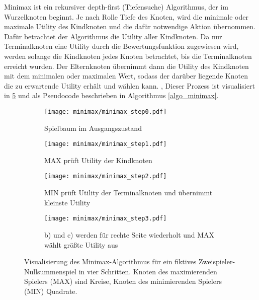 Minimax ist ein rekursiver depth-first (\dt Tiefensuche) Algorithmus, der im Wurzelknoten beginnt. 
Je nach Rolle \bzw Tiefe des Knoten, wird die minimale oder maximale Utility des Kindknoten und die dafür notwendige Aktion übernommen. 
Dafür betrachtet der Algorithmus die Utility aller Kindknoten. 
Da nur Terminalknoten eine Utility durch die Bewertungsfunktion zugewiesen wird, werden solange die Kindknoten jedes Knoten betrachtet, bis die Terminalknoten erreicht wurden. 
Der Elternknoten übernimmt dann die Utility des Kindknoten mit dem minimalen oder maximalen Wert, sodass der darüber liegende Knoten die zu erwartende Utility erhält und wählen kann. \cite[S. 123ff.]{russellArtificialIntelligenceModern2021}, \cite[S. 654ff.]{millingtonArtificialIntelligenceGames2009}
Dieser Prozess ist visualisiert in \cref{fig:minimax_example} und als Pseudocode beschrieben in Algorithmus \ref{algo_minimax}.

\begin{figure}
    \centering
    \begin{subfigure}[b]{0.45\textwidth}
      \centering
      \texttt{[image: minimax/minimax\_step0.pdf]}
      \caption{Spielbaum im Ausgangszustand}
      \label{fig:minimax_step0}
    \end{subfigure}
    \begin{subfigure}[b]{0.45\textwidth}
      \centering
      \texttt{[image: minimax/minimax\_step1.pdf]}
      \caption{MAX prüft Utility der Kindknoten}
      \label{fig:minimax_step1}
    \end{subfigure}
    \begin{subfigure}[b]{0.45\textwidth}
      \centering
      \texttt{[image: minimax/minimax\_step2.pdf]}
      \caption{MIN prüft Utility der Terminalknoten und übernimmt kleinste Utility}
      \label{fig:minimax_step2}
    \end{subfigure}
    \begin{subfigure}[b]{0.45\textwidth}
      \centering
      \texttt{[image: minimax/minimax\_step3.pdf]}
      \caption{b) und c) werden für rechte Seite wiederholt und MAX wählt größte Utility aus}
      \label{fig:minimax_step3}
    \end{subfigure}
    \caption[Visualisierung des Minimax-Algorithmus]{Visualisierung des Minimax-Algorithmus für ein fiktives Zweispieler-Nullsummenspiel in vier Schritten. Knoten des maximierenden Spielers (MAX) sind Kreise, Knoten des minimierenden Spielers (MIN) Quadrate.}
    \label{fig:minimax_example}
\end{figure}


